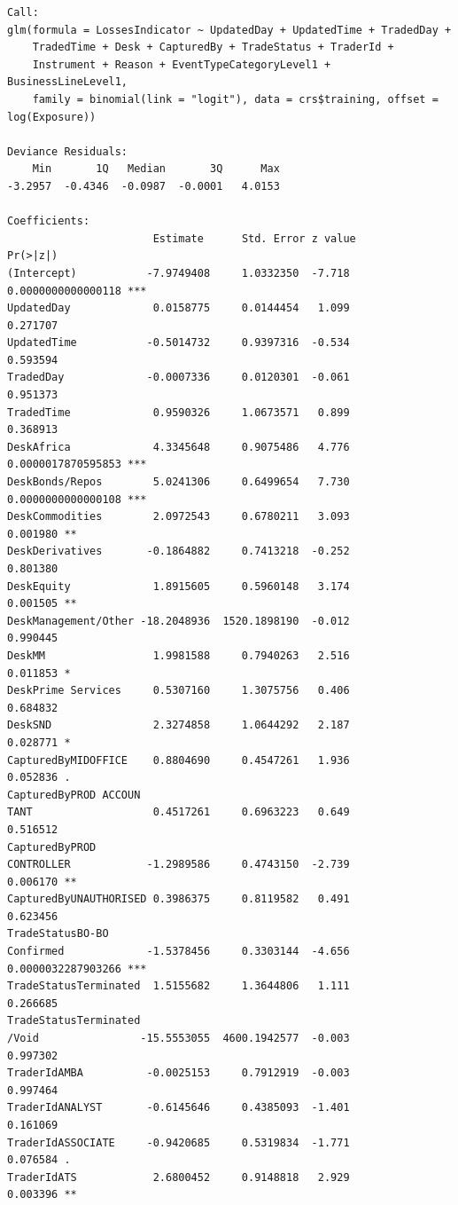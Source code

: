 \documentclass{DissertateUSU}
\begin{document}
\begin{verbatim}
Call:
glm(formula = LossesIndicator ~ UpdatedDay + UpdatedTime + TradedDay + 
    TradedTime + Desk + CapturedBy + TradeStatus + TraderId + 
    Instrument + Reason + EventTypeCategoryLevel1 + BusinessLineLevel1, 
    family = binomial(link = "logit"), data = crs$training, offset = log(Exposure))

Deviance Residuals: 
    Min       1Q   Median       3Q      Max  
-3.2957  -0.4346  -0.0987  -0.0001   4.0153  

Coefficients:
                       Estimate      Std. Error z value           Pr(>|z|)    
(Intercept)           -7.9749408     1.0332350  -7.718 0.0000000000000118 ***
UpdatedDay             0.0158775     0.0144454   1.099           0.271707    
UpdatedTime           -0.5014732     0.9397316  -0.534           0.593594    
TradedDay             -0.0007336     0.0120301  -0.061           0.951373    
TradedTime             0.9590326     1.0673571   0.899           0.368913    
DeskAfrica             4.3345648     0.9075486   4.776 0.0000017870595853 ***
DeskBonds/Repos        5.0241306     0.6499654   7.730 0.0000000000000108 ***
DeskCommodities        2.0972543     0.6780211   3.093           0.001980 ** 
DeskDerivatives       -0.1864882     0.7413218  -0.252           0.801380    
DeskEquity             1.8915605     0.5960148   3.174           0.001505 ** 
DeskManagement/Other -18.2048936  1520.1898190  -0.012           0.990445    
DeskMM                 1.9981588     0.7940263   2.516           0.011853 *  
DeskPrime Services     0.5307160     1.3075756   0.406           0.684832    
DeskSND                2.3274858     1.0644292   2.187           0.028771 *  
CapturedByMIDOFFICE    0.8804690     0.4547261   1.936           0.052836 .  
CapturedByPROD ACCOUN
TANT                   0.4517261     0.6963223   0.649           0.516512    
CapturedByPROD 
CONTROLLER            -1.2989586     0.4743150  -2.739           0.006170 ** 
CapturedByUNAUTHORISED 0.3986375     0.8119582   0.491           0.623456    
TradeStatusBO-BO 
Confirmed             -1.5378456     0.3303144  -4.656 0.0000032287903266 ***
TradeStatusTerminated  1.5155682     1.3644806   1.111           0.266685    
TradeStatusTerminated
/Void                -15.5553055  4600.1942577  -0.003           0.997302    
TraderIdAMBA          -0.0025153     0.7912919  -0.003           0.997464    
TraderIdANALYST       -0.6145646     0.4385093  -1.401           0.161069    
TraderIdASSOCIATE     -0.9420685     0.5319834  -1.771           0.076584 .  
TraderIdATS            2.6800452     0.9148818   2.929           0.003396 ** 

\end{verbatim}
\end{document}
